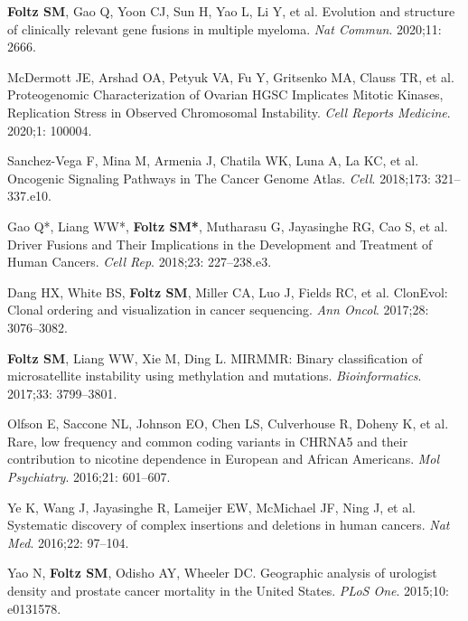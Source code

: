 \documentclass[11pt]{article}
\begin{document}
\begin{etaremune}
\item \textbf{Foltz SM}, Gao Q, Yoon CJ, Sun H, Yao L, Li Y, et al. Evolution and structure of clinically relevant gene fusions in multiple myeloma. \emph{Nat Commun}. 2020;11: 2666.

\item McDermott JE, Arshad OA, Petyuk VA, Fu Y, Gritsenko MA, Clauss TR, et al. Proteogenomic Characterization of Ovarian HGSC Implicates Mitotic Kinases, Replication Stress in Observed Chromosomal Instability. \emph{Cell Reports Medicine}. 2020;1: 100004.

\item Sanchez-Vega F, Mina M, Armenia J, Chatila WK, Luna A, La KC, et al. Oncogenic Signaling Pathways in The Cancer Genome Atlas. \emph{Cell}. 2018;173: 321–337.e10.

\item Gao Q*, Liang WW*, \textbf{Foltz SM*}, Mutharasu G, Jayasinghe RG, Cao S, et al. Driver Fusions and Their Implications in the Development and Treatment of Human Cancers. \emph{Cell Rep}. 2018;23: 227–238.e3.

\item Dang HX, White BS, \textbf{Foltz SM}, Miller CA, Luo J, Fields RC, et al. ClonEvol: Clonal ordering and visualization in cancer sequencing. \emph{Ann Oncol}. 2017;28: 3076–3082.

\item \textbf{Foltz SM}, Liang WW, Xie M, Ding L. MIRMMR: Binary classification of microsatellite instability using methylation and mutations. \emph{Bioinformatics}. 2017;33: 3799–3801.

\item Olfson E, Saccone NL, Johnson EO, Chen LS, Culverhouse R, Doheny K, et al. Rare, low frequency and common coding variants in CHRNA5 and their contribution to nicotine dependence in European and African Americans. \emph{Mol Psychiatry}. 2016;21: 601–607.

\item Ye K, Wang J, Jayasinghe R, Lameijer EW, McMichael JF, Ning J, et al. Systematic discovery of complex insertions and deletions in human cancers. \emph{Nat Med}. 2016;22: 97–104.

\item Yao N, \textbf{Foltz SM}, Odisho AY, Wheeler DC. Geographic analysis of urologist density and prostate cancer mortality in the United States. \emph{PLoS One}. 2015;10: e0131578.

\end{etaremune}
\end{document}
